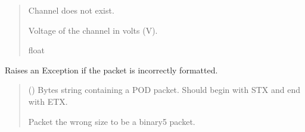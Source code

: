 \documentclass[letterpaper,10pt,english]{sphinxmanual}
\begin{document}
\begin{fulllineitems}
\begin{fulllineitems}
\begin{quote}
\begin{description}
\sphinxAtStartPar
{} \textendash{} Channel does not exist.

\sphinxAtStartPar
Voltage of the channel in volts (V).

\sphinxAtStartPar
float

\end{description}\end{quote}

\end{fulllineitems}


\begin{fulllineitems}
\label{\detokenize{PodApi.Packets:PodApi.Packets.Binary5.PacketBinary5.CheckIfPacketIsValid}}
\pysigstartsignatures
{}
\pysigstopsignatures
\sphinxAtStartPar
Raises an Exception if the packet is incorrectly formatted.
\begin{quote}\begin{description}
\sphinxAtStartPar
{} () \textendash{} Bytes string containing a POD packet. Should begin with STX                 and end with ETX.

\sphinxAtStartPar
{} \textendash{} Packet the wrong size to be a binary5 packet.

\end{description}\end{quote}

\end{fulllineitems}



\end{fulllineitems}
\end{document}
